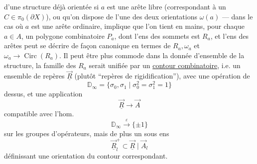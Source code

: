 
d'une structure déjà orientée si $a$ est une arête libre (correspondant à un $C\in\pi_0(\partial X)$), ou qu'on dispose de l'une des deux orientations $\omega(a)$ --- dans le cas où $a$ est une arête ordinaire, implique que l'on tient en mains, pour chaque $a\in A$, un polygone combinatoire $P_a$, dont l'ens des sommets est $R_a$, et l'ens des arêtes peut se décrire  de façon canonique en termes de $R_a,\omega_a$ et $\omega_a\longrightarrow\operatorname{Circ}(R_a)$.
Il peut être plus commode dans la donnée d'ensemble de la structure,  la famille des $R_a$ serait unifiée par un
\uline{contour combinatoire}, i.e. un ensemble de repères $\vec{\underline R}$ (plutôt ``repères de rigidification''), avec une opération de
\[
 \mathbb D_\infty=\{\sigma_0,\sigma_1\mid\sigma_0^2=\sigma_1^2=1\}
\]
dessus, et une application
\[
 \vec{\underline R}\longrightarrow\vec A
\]
compatible avec l'hom.
\[
 \mathbb D_\infty\xrightarrow{\varepsilon}\{\pm1\}
\]
sur les groupes d'opérateurs, mais de plus un sous ens
\[
 \vec{\underline R}_l^+\subset\vec{\underline R}\mid\vec A_l
\]
définissant une orientation du contour correspondant.
